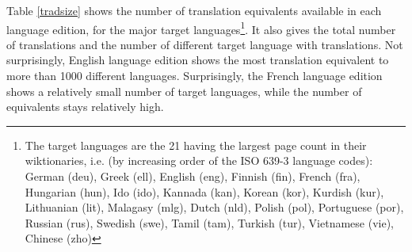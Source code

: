 \documentclass[sw]{iosart2c}
\begin{document}
Table \ref{tradsize} shows the number of translation equivalents available in each language edition, for the major target languages\footnote{The target languages are the 21 having the largest page count in their wiktionaries, i.e. (by increasing order of the ISO 639-3 language codes):
German (deu),
Greek (ell),
English (eng),
Finnish (fin),
French (fra),
Hungarian (hun),
Ido (ido),
Kannada (kan),
Korean (kor),
Kurdish (kur),
Lithuanian (lit),
Malagasy (mlg),
Dutch (nld),
Polish (pol),
Portuguese (por),
Russian (rus),
Swedish (swe),
Tamil (tam),
Turkish (tur),
Vietnamese (vie),
Chinese (zho)
}. It also gives the total number of translations and the number of different target language with translations. Not surprisingly, English language edition shows the most translation equivalent to more than 1000 different languages. Surprisingly, the French language edition shows a relatively small number of target languages, while the number of equivalents stays relatively high. 
\end{document}
